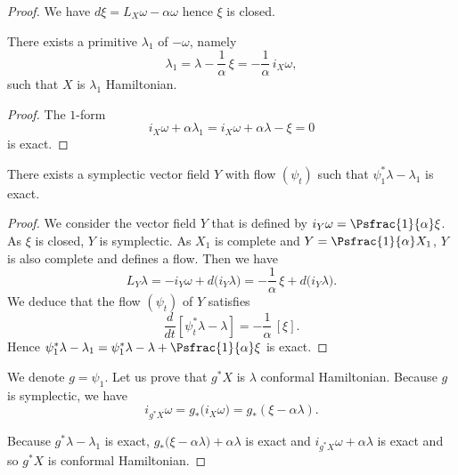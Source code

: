 \begin{proof}
We have $d\xi=L_X\omega-\alpha \omega$ hence $\xi$ is closed.
\begin{lemma}\label{L3}
There exists a primitive $\lambda_1$ of $-\omega$, namely
\[
\lambda_1=\lambda-\frac{1}{\alpha}\,\xi=-\frac{1}{\alpha}\,i_X\omega,
\]
such that $X$ is $\lambda_1$ Hamiltonian.
\end{lemma}

\begin{proof}
The $1$-form
\[
i_X\omega+\alpha\lambda_1=i_X\omega+\alpha\lambda-\xi=0
\]
is exact.
\end{proof}

\begin{lemma}\label{L4}
There exists a symplectic vector field $Y$ with flow $(\psi_t)$ such that $\psi_1^*\lambda-\lambda_1$ is exact.
\end{lemma}

\begin{proof}
We consider the vector field $Y$ that is defined by $i_Y\omega=\Psfrac{1}{\alpha}\xi$. As $\xi$ is closed, $Y$ is symplectic. As $X_1$ is complete and $Y=\Psfrac{1}{\alpha}X_1$, $Y$ is also complete and defines a flow. Then we have
\[
L_Y\lambda=-i_Y\omega+d\big(i_Y\lambda\big)=-\frac{1}{\alpha}\,\xi+d\big(i_Y\lambda\big).
\]
We deduce that the flow $(\psi_t)$ of $Y$ satisfies
\[
\frac{d}{dt}[\psi_t^*\lambda-\lambda]=-\frac{1}{\alpha}\,[\xi].
\]
Hence $\psi_1^*\lambda-\lambda_1=\psi_1^*\lambda-\lambda+\Psfrac{1}{\alpha}\xi$ is exact.
\end{proof}

We denote $g=\psi_1$. Let us prove that $g^*X$ is $\lambda$ conformal Hamiltonian. Because $g$ is symplectic, we have
\[
i_{g^*X}\omega=g_{*}\big( i_X\omega\big)=g_{*}(\xi-\alpha\lambda).
\]

Because $g^*\lambda-\lambda_1$ is exact, $g_*\big( \xi-\alpha\lambda\big)+\alpha\lambda$ is exact and $i_{g^*X}\omega+\alpha\lambda$ is exact and so $g^*X$ is conformal Hamiltonian.
\end{proof}

